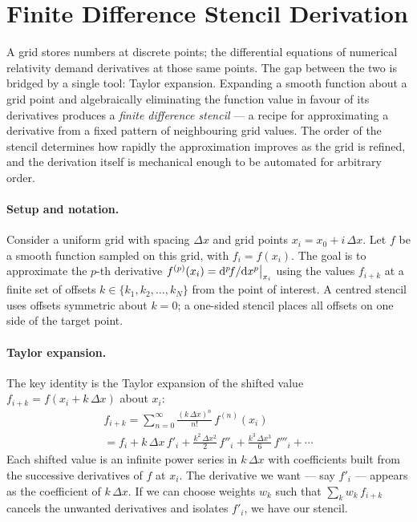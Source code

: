 \section{Finite Difference Stencil Derivation}
\label{sec:fd-stencils}

A grid stores numbers at discrete points; the differential equations of
numerical relativity demand derivatives at those same points.  The gap between
the two is bridged by a single tool: Taylor expansion.  Expanding a smooth
function about a grid point and algebraically eliminating the function value in
favour of its derivatives produces a \emph{finite difference stencil} --- a
recipe for approximating a derivative from a fixed pattern of neighbouring grid
values.  The order of the stencil determines how rapidly the approximation
improves as the grid is refined, and the derivation itself is mechanical enough
to be automated for arbitrary order.

\paragraph{Setup and notation.}

Consider a uniform grid with spacing $\Delta x$ and grid points
$x_i = x_0 + i\,\Delta x$.  Let $f$ be a smooth function sampled on this
grid, with $f_i = f(x_i)$.  The goal is to approximate the $p$-th derivative
$f^{(p)}(x_i) = \mathrm{d}^p\!f/\mathrm{d} x^p\big|_{x_i}$ using the values
$f_{i+k}$ at a finite set of offsets $k \in \{k_1, k_2, \ldots, k_N\}$
from the point of interest.  A centred stencil uses offsets symmetric about
$k = 0$; a one-sided stencil places all offsets on one side of the target
point.

\paragraph{Taylor expansion.}

The key identity is the Taylor expansion of the shifted value
$f_{i+k} = f(x_i + k\,\Delta x)$ about $x_i$:
%
\begin{multline}
  f_{i+k} = \sum_{n=0}^{\infty} \frac{(k\,\Delta x)^n}{n!}\,f^{(n)}(x_i) \\
  = f_i + k\,\Delta x\,f'_i + \frac{k^2\,\Delta x^2}{2}\,f''_i
    + \frac{k^3\,\Delta x^3}{6}\,f'''_i + \cdots
  \label{eq:taylor-grid}
\end{multline}
%
Each shifted value is an infinite power series in $k\,\Delta x$ with
coefficients built from the successive derivatives of $f$ at $x_i$.  The derivative we want ---
say $f'_i$ --- appears as the coefficient of $k\,\Delta x$.  If we can choose
weights $w_k$ such that $\sum_k w_k\,f_{i+k}$ cancels the unwanted
derivatives and isolates $f'_i$, we have our stencil.

